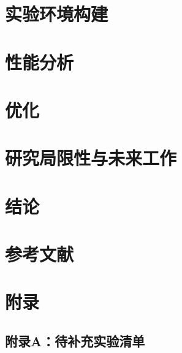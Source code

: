 \documentclass[12pt, a4paper, fontset=macnew]{ctexart}
\begin{document}
\section{实验环境构建}\label{ch:env}


\section{性能分析}\label{ch:perf}


\section{优化}\label{ch:opt}


\section{研究局限性与未来工作}\label{ch:future}


\clearpage
\section{结论}\label{ch:conclusion}


\clearpage
\section*{参考文献}

\printbibliography[heading=none]

\clearpage
\section*{附\quad 录}

\subsection*{附录A：待补充实验清单}
\end{document}
